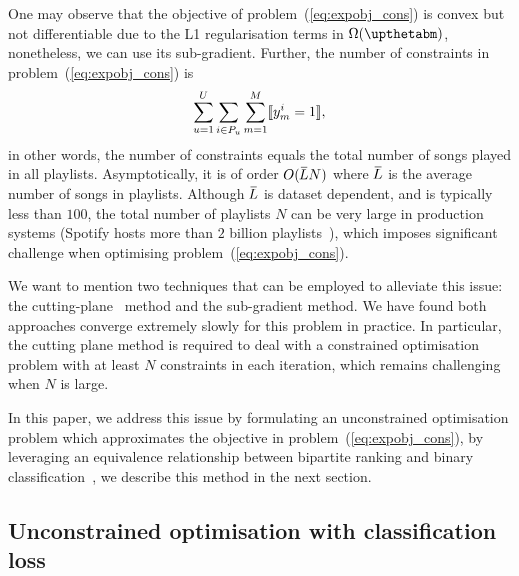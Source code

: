 One may observe that the objective of problem~(\ref{eq:expobj_cons}) is convex but not differentiable due to 
the L1 regularisation terms in $\Omega(\upthetabm)$, nonetheless, we can use its sub-gradient.
Further, the number of constraints in problem~(\ref{eq:expobj_cons}) is
$$
\sum_{u=1}^U \sum_{i \in P_u} \sum_{m=1}^M \llbracket y_m^i = 1 \rrbracket,
$$
in other words, the number of constraints equals the total number of songs played in all playlists.
Asymptotically, it is of order $O(\widebar{L} N)$ where $\widebar{L}$ is the average number of songs in playlists.
Although $\widebar{L}$ is dataset dependent, and is typically less than $100$,
the total number of playlists $N$ can be very large in production systems 
(\eg Spotify hosts more than $2$ billion playlists~\cite{recsysch2018}),
which imposes significant challenge when optimising problem~(\ref{eq:expobj_cons}).

We want to mention two techniques that can be employed to alleviate this issue:
the cutting-plane~\cite{avriel2003nonlinear} method and the sub-gradient method.
We have found both approaches converge extremely slowly for this problem in practice.
In particular, the cutting plane method is required to deal with a constrained optimisation problem 
with at least $N$ constraints in each iteration, which remains challenging when $N$ is large.

In this paper, we address this issue by formulating an unconstrained optimisation problem which approximates 
the objective in problem~(\ref{eq:expobj_cons}), by leveraging an equivalence relationship between bipartite 
ranking and binary classification~\cite{ertekin2011equivalence}, we describe this method in the next section.




\subsection{Unconstrained optimisation with classification loss}

